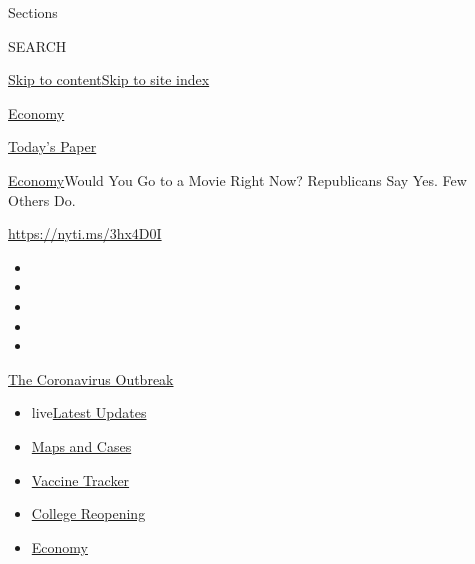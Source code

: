 Sections

SEARCH

\protect\hyperlink{site-content}{Skip to
content}\protect\hyperlink{site-index}{Skip to site index}

\href{https://www.nytimes.com/section/business/economy}{Economy}

\href{https://myaccount.nytimes.com/auth/login?response_type=cookie\&client_id=vi}{}

\href{https://www.nytimes.com/section/todayspaper}{Today's Paper}

\href{/section/business/economy}{Economy}\textbar{}Would You Go to a
Movie Right Now? Republicans Say Yes. Few Others Do.

\url{https://nyti.ms/3hx4D0I}

\begin{itemize}
\item
\item
\item
\item
\item
\end{itemize}

\href{https://www.nytimes.com/news-event/coronavirus?action=click\&pgtype=Article\&state=default\&region=TOP_BANNER\&context=storylines_menu}{The
Coronavirus Outbreak}

\begin{itemize}
\tightlist
\item
  live\href{https://www.nytimes.com/2020/08/04/world/coronavirus-covid-19.html?action=click\&pgtype=Article\&state=default\&region=TOP_BANNER\&context=storylines_menu}{Latest
  Updates}
\item
  \href{https://www.nytimes.com/interactive/2020/us/coronavirus-us-cases.html?action=click\&pgtype=Article\&state=default\&region=TOP_BANNER\&context=storylines_menu}{Maps
  and Cases}
\item
  \href{https://www.nytimes.com/interactive/2020/science/coronavirus-vaccine-tracker.html?action=click\&pgtype=Article\&state=default\&region=TOP_BANNER\&context=storylines_menu}{Vaccine
  Tracker}
\item
  \href{https://www.nytimes.com/2020/08/02/us/covid-college-reopening.html?action=click\&pgtype=Article\&state=default\&region=TOP_BANNER\&context=storylines_menu}{College
  Reopening}
\item
  \href{https://www.nytimes.com/live/2020/08/03/business/stock-market-today-coronavirus?action=click\&pgtype=Article\&state=default\&region=TOP_BANNER\&context=storylines_menu}{Economy}
\end{itemize}

